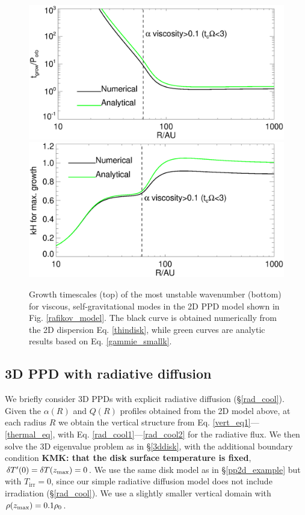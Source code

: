 \begin{figure}
  \includegraphics[width=\linewidth,clip=true,trim=0cm 1.5cm 0cm
    0.0cm]{figures/ppd_2d_growth}\\
  \includegraphics[width=\linewidth,clip=true,trim=0cm 0cm 0cm
    0.8cm]{figures/ppd_2d_maxk}
  \caption{Growth timescales (top) of the most unstable
    wavenumber (bottom) for viscous,
    self-gravitational modes in the 2D PPD model shown in
    Fig. \ref{rafikov_model}. 
    The black curve is obtained numerically
    from the 2D dispersion Eq. \ref{thindisk}, while green curves 
    are analytic results based on Eq. \ref{gammie_smallk}. 
    \label{rafikov_growth}}
\end{figure}


\subsection{3D PPD with radiative diffusion}
We briefly consider 3D PPDs with explicit radiative diffusion
(\S\ref{rad_cool}). 
Given the $\alpha(R)$ and $Q(R)$ profiles obtained
from the 2D model above, at each radius $R$ we obtain the vertical
structure from Eq. \ref{vert_eq1}---\ref{thermal_eq}, with 
Eq. \ref{rad_cool1}---\ref{rad_cool2} for the radiative flux.
We then solve the 3D eigenvalue problem as in \S\ref{3ddisk}, with the
additional boundary condition {\bf KMK: that the disk surface temperature is fixed},
 $\delta T^\prime(0) = \delta T(z_\mathrm{max}) = 0$.    
We use the same disk model as in \S\ref{pp2d_example} but 
with $T_\mathrm{irr}=0$, since our simple radiative diffusion model
does not include irradiation (\S\ref{rad_cool}). 
We use a slightly smaller vertical
domain with $\rho(z_\mathrm{max})=0.1\rho_0$.  %

